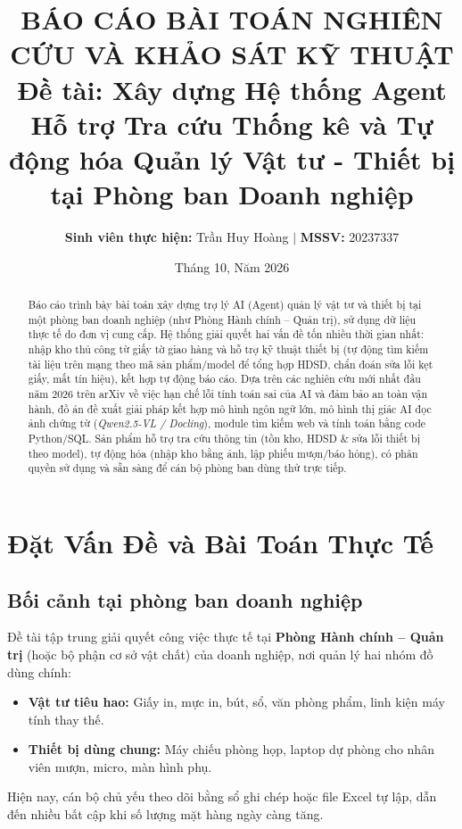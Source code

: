 \documentclass[11pt,a4paper]{article}
\title{\vspace{-2.0cm}\textbf{\Large BÁO CÁO BÀI TOÁN NGHIÊN CỨU VÀ KHẢO SÁT KỸ THUẬT\\[0.3em]
\large Đề tài: Xây dựng Hệ thống Agent Hỗ trợ Tra cứu Thống kê và Tự động hóa Quản lý Vật tư - Thiết bị tại Phòng ban Doanh nghiệp}}
\author{\textbf{Sinh viên thực hiện:} Trần Huy Hoàng \quad $\vert$ \quad \textbf{MSSV:} 20237337}
\date{\small Tháng 10, Năm 2026}
\begin{document}
\maketitle
\vspace{-0.85cm}

\begin{abstract}
Báo cáo trình bày bài toán xây dựng trợ lý AI (Agent) quản lý vật tư và thiết bị tại một phòng ban doanh nghiệp (như Phòng Hành chính -- Quản trị), sử dụng dữ liệu thực tế do đơn vị cung cấp. Hệ thống giải quyết hai vấn đề tốn nhiều thời gian nhất: nhập kho thủ công từ giấy tờ giao hàng và hỗ trợ kỹ thuật thiết bị (tự động tìm kiếm tài liệu trên mạng theo mã sản phẩm/model để tổng hợp HDSD, chẩn đoán sửa lỗi kẹt giấy, mất tín hiệu), kết hợp tự động báo cáo. Dựa trên các nghiên cứu mới nhất đầu năm 2026 trên arXiv về việc hạn chế lỗi tính toán sai của AI và đảm bảo an toàn vận hành, đồ án đề xuất giải pháp kết hợp mô hình ngôn ngữ lớn, mô hình thị giác AI đọc ảnh chứng từ (\textit{Qwen2.5-VL / Docling}), module tìm kiếm web và tính toán bằng code Python/SQL. Sản phẩm hỗ trợ tra cứu thông tin (tồn kho, HDSD \& sửa lỗi thiết bị theo model), tự động hóa (nhập kho bằng ảnh, lập phiếu mượn/báo hỏng), có phân quyền sử dụng và sẵn sàng để cán bộ phòng ban dùng thử trực tiếp.
\end{abstract}

\section{Đặt Vấn Đề và Bài Toán Thực Tế}

\subsection{Bối cảnh tại phòng ban doanh nghiệp}
Đề tài tập trung giải quyết công việc thực tế tại \textbf{Phòng Hành chính -- Quản trị} (hoặc bộ phận cơ sở vật chất) của doanh nghiệp, nơi quản lý hai nhóm đồ dùng chính:
\begin{itemize}
    \item \textbf{Vật tư tiêu hao:} Giấy in, mực in, bút, sổ, văn phòng phẩm, linh kiện máy tính thay thế.
    \item \textbf{Thiết bị dùng chung:} Máy chiếu phòng họp, laptop dự phòng cho nhân viên mượn, micro, màn hình phụ.
\end{itemize}

Hiện nay, cán bộ chủ yếu theo dõi bằng sổ ghi chép hoặc file Excel tự lập, dẫn đến nhiều bất cập khi số lượng mặt hàng ngày càng tăng.
\end{document}
